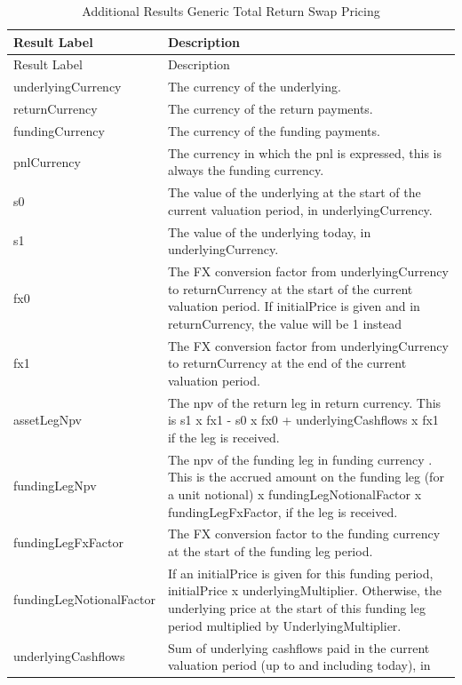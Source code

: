 \begin{longtable}{|p{10cm}|p{6cm}|}
\caption{Additional Results Generic Total Return Swap Pricing}
\label{tab:additional_results_generic_trs} \\
  \hline
  Result Label & Description \\
  \hline
\endfirsthead
  \hline
  Result Label & Description \\
  \hline
\endhead
  \hline
\endfoot
  \hline
\endlastfoot
  underlyingCurrency & The currency of the underlying. \\
  \hline
  returnCurrency & The currency of the return payments. \\
  \hline
  fundingCurrency & The currency of the funding payments. \\
  \hline
  pnlCurrency & The currency in which the pnl is expressed, this is always the funding currency. \\
  \hline
  s0 & The value of the underlying at the start of the current valuation period, in underlyingCurrency. \\
  \hline
  s1 & The value of the underlying today, in underlyingCurrency. \\
  \hline
  fx0 & The FX conversion factor from underlyingCurrency to returnCurrency at the start of the current valuation period.
        If initialPrice is given and in returnCurrency, the value will be 1 instead\\
  \hline
  fx1 & The FX conversion factor from underlyingCurrency to returnCurrency at the end of the current valuation period.  \\
  \hline
  assetLegNpv & The npv of the return leg in return currency. This is s1 x fx1 - s0 x fx0 + underlyingCashflows x fx1 if the leg is received. \\
  \hline
  fundingLegNpv & The npv of the funding leg in funding currency . This is the accrued amount on the funding leg (for a unit notional) x
                  fundingLegNotionalFactor x fundingLegFxFactor, if the leg is received. \\
  \hline
  fundingLegFxFactor & The FX conversion factor to the funding currency at the start of the funding leg period.  \\
  \hline
  fundingLegNotionalFactor & If an initialPrice is given for this funding period, initialPrice x underlyingMultiplier. Otherwise, the underlying price at the start of this funding leg period multiplied by UnderlyingMultiplier. \\
  \hline
  underlyingCashflows & Sum of underlying cashflows paid in the current valuation period (up to and including today), in

\end{longtable}
